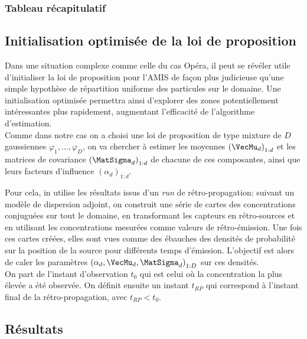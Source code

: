 \subsubsection{Tableau récapitulatif}




\subsection{Initialisation optimisée de la loi de proposition}

Dans une situation complexe comme celle du cas Opéra, il peut se révéler utile d'initialiser la loi de proposition pour l'AMIS de façon plus judicieuse qu'une simple hypothèse de répartition uniforme des particules sur le domaine. Une initialisation optimisée permettra ainsi d'explorer des zones potentiellement intéressantes plus rapidement, augmentant l'efficacité de l'algorithme d'estimation. \\

Comme dans notre cas on a choisi une loi de proposition de type mixture de $D$ gaussiennes $\varphi_1, \dots, \varphi_D$, on va chercher à estimer les moyennes $\left(\VecMu_d\right)_{1:d}$ et les matrices de covariance $\left(\MatSigma_d\right)_{1:d}$ de chacune de ces composantes, ainsi que leurs facteurs d'influence $\left(\alpha_d\right)_{1:d}$. 

Pour cela, in utilise les résultats issus d'un \textit{run} de rétro-propagation: suivant un modèle de dispersion adjoint, on construit une série de cartes des concentrations conjuguées sur tout le domaine, en transformant les capteurs en rétro-sources et en utilisant les concentrations mesurées comme valeurs de rétro-émission. Une fois ces cartes créées, elles sont vues comme des ébauches des densités de probabilité sur la position de la source pour différents temps d'émission. L'objectif est alors de caler les paramètres $\left(\alpha_d, \VecMu_d,\MatSigma_d \right)_{1:D}$ sur ces densités.\\

On part de l'instant d'observation $t_0$ qui est celui où la concentration la plus élevée a été observée. On définit ensuite un instant $t_{RP}$ qui correspond à l'instant final de la rétro-propagation, avec $t_{RP} < t_0$. 

\subsection{Résultats}

